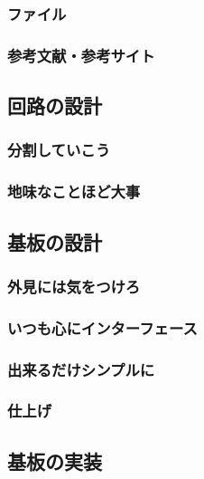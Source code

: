 \documentclass[dvipdfmx]{jsarticle}
\begin{document}
\subsubsection{ファイル}

\subsubsection{参考文献・参考サイト}


\subsection{回路の設計}

\subsubsection{分割していこう}

\subsubsection{地味なことほど大事}


\subsection{基板の設計}

\subsubsection{外見には気をつけろ}

\subsubsection{いつも心にインターフェース}

\subsubsection{出来るだけシンプルに}

\subsubsection{仕上げ}


\subsection{基板の実装}
\end{document}
